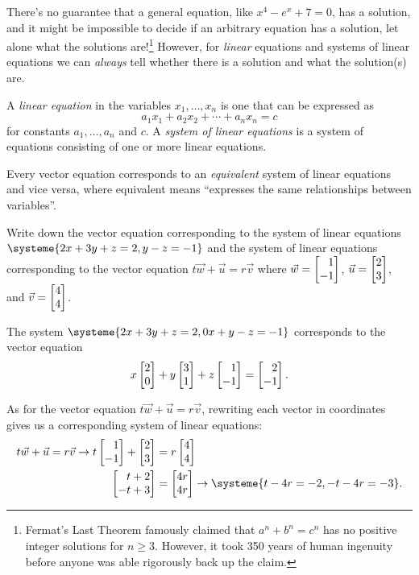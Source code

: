 
	There's no guarantee that a general equation, like $x^4-e^x+7=0$, has a solution, and it might
	be impossible to decide if an arbitrary equation has a solution, let alone what the solutions 
	are!\footnote{ Fermat's Last Theorem famously claimed that $a^n+b^n=c^n$
	has no positive integer solutions for $n\geq 3$. However, it took 350 years of human ingenuity before anyone was able rigorously
	back up the claim.} However, for \emph{linear} equations and systems of linear equations we can \emph{always} tell
	whether there is a solution and what the solution(s) are.
	
	\begin{definition}
		A \emph{linear equation} in the variables $x_1,\ldots,x_n$ is one that can be expressed
		as
		\[
			a_1x_1+a_2x_2+\cdots+a_nx_n=c
		\]
		for constants $a_1,\ldots, a_n$ and $c$. A \emph{system of linear equations} is a system of equations 
		consisting of one or more linear equations.
	\end{definition}

	Every vector equation corresponds to an \emph{equivalent} system of linear equations and vice versa, where equivalent
	means ``expresses the same relationships between variables''.

	\begin{example}
		Write down the vector equation corresponding to the system of linear equations $\systeme{2x+3y+z=2,y-z=-1}$
		and the system of linear equations corresponding to the vector equation $t\vec w+\vec u=r\vec v$ where $\vec w=\mat{1\\-1}$, $\vec u=\mat{2\\3}$,
		and $\vec v=\mat{4\\4}$.

		The system $\systeme{2x+3y+z=2,0x+y-z=-1}$ corresponds to the vector equation
		\[
			x\mat{2\\0} + y\mat{3\\1} + z\mat{1\\-1} = \mat{2\\-1}.
		\]
		
		As for the vector equation $t\vec w+\vec u=r\vec v$, rewriting each vector in coordinates gives us a corresponding system of linear equations:
		\begin{align*}
			t\vec w + \vec u = r\vec v
			\rightarrow
			t\mat{1\\-1} + \mat{2\\3} &= r\mat{4\\4}\\
			\mat{t+2\\-t+3} &= \mat{4r\\4r}
			\rightarrow
			\systeme{t-4r=-2, -t-4r=-3}.
		\end{align*}
	\end{example}

